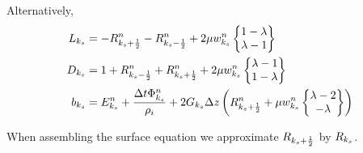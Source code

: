 \documentclass{article}
\begin{document}
\renewcommand{\Rp}{R^{n}_{\ks+\frac{1}{2}}}
\renewcommand{\Rm}{R^{n}_{\ks-\frac{1}{2}}}
\renewcommand{\W}{w^{n}_{\ks}}

Alternatively,
\begin{align}
  L_{\ks} &= -\Rp -\Rm + 2\mu\W \wstack{1 - \lambda}{\lambda - 1}\\
  D_{\ks} &= 1 + \Rm + \Rp + 2\mu\W \wstack{\lambda - 1}{1 - \lambda}\\
  b_{\ks} &= \rhs{\ks} + 2G_{\ks}\Delta z\left( \Rp + \mu\W\wstack{\lambda-2}{-\lambda} \right)
\end{align}

When assembling the surface equation we approximate $R_{k_{s} + \frac{1}{2}}$ by $R_{k_{s}}$.
\end{document}
